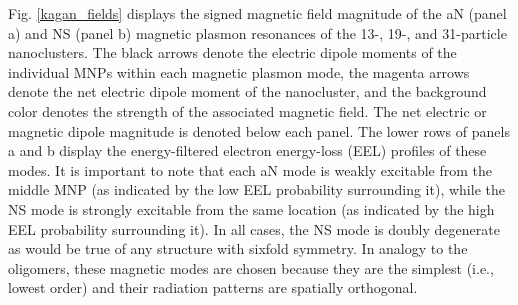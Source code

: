 \documentclass [11pt, proquest] {uwthesis}[2016/11/22]
\begin{document}
Fig. \ref{kagan_fields} displays the signed magnetic field magnitude of the aN (panel a) and NS (panel b) magnetic plasmon resonances of the 13-, 19-, and 31-particle nanoclusters. The black arrows denote the electric dipole moments of the individual MNPs within each magnetic plasmon mode, the magenta arrows denote the net electric dipole moment of the nanocluster, and the background color denotes the strength of the associated magnetic field. The net electric or magnetic dipole magnitude is denoted below each panel. The lower rows of panels a and b display the energy-filtered electron energy-loss (EEL) profiles of these modes. It is important to note that each aN mode is weakly excitable from the middle MNP (as indicated by the low EEL probability surrounding it), while the NS mode is strongly excitable from the same location (as indicated by the high EEL probability surrounding it). In all cases, the NS mode is doubly degenerate as would be true of any structure with sixfold symmetry. In analogy to the oligomers, these magnetic modes are chosen because they are the simplest (i.e., lowest order) and their radiation patterns are spatially orthogonal. 
\end{document}
